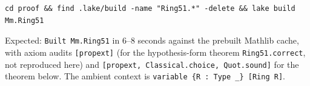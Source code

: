 \documentclass[11pt]{article}
\theoremstyle{definition}
\theoremstyle{remark}
\begin{document}
\begin{verbatim}
cd proof && find .lake/build -name "Ring51.*" -delete && lake build Mm.Ring51
\end{verbatim}

\noindent
Expected: \texttt{Built Mm.Ring51} in 6--8 seconds against the
prebuilt Mathlib cache, with axiom audits
\texttt{[propext]} (for the hypothesis-form theorem
\texttt{Ring51.correct}, not reproduced here) and
\texttt{[propext, Classical.choice, Quot.sound]} for the theorem
below.  The ambient context is
\texttt{variable \{R : Type \_\} [Ring R]}.

{\footnotesize

}
\end{document}
